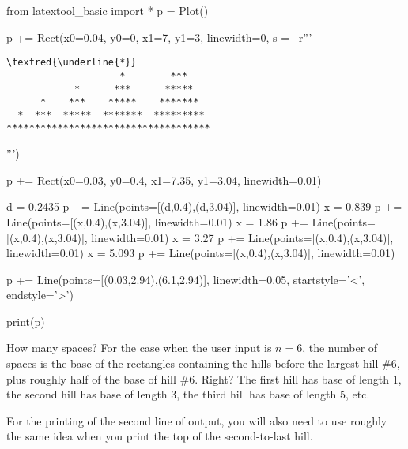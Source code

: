 \begin{python}
from latextool_basic import *
p = Plot()

p += Rect(x0=0.04, y0=0, x1=7, y1=3, linewidth=0, s = \
r'''\begin{Verbatim}[commandchars=\\\{\}]
                              \textred{\underline{*}}     
                    *        ***    
            *      ***      *****   
      *    ***    *****    *******  
  *  ***  *****  *******  ********* 
************************************
\end{Verbatim}''')

p += Rect(x0=0.03, y0=0.4, x1=7.35, y1=3.04, linewidth=0.01)

d = 0.2435
p += Line(points=[(d,0.4),(d,3.04)], linewidth=0.01)
x = 0.839
p += Line(points=[(x,0.4),(x,3.04)], linewidth=0.01)
x = 1.86
p += Line(points=[(x,0.4),(x,3.04)], linewidth=0.01)
x = 3.27
p += Line(points=[(x,0.4),(x,3.04)], linewidth=0.01)
x = 5.093
p += Line(points=[(x,0.4),(x,3.04)], linewidth=0.01)

p += Line(points=[(0.03,2.94),(6.1,2.94)], linewidth=0.05, startstyle='<', endstyle='>')


print(p)
\end{python}

How many spaces?
For the case when the user input is $n = 6$, the number of spaces
is the base of the rectangles containing the hills
before the largest hill \#6, plus roughly half of the base of hill \#6.
Right?
The first hill has base of length 1, the second hill has base of length 3,
the third hill has base of length 5, etc.

For the printing of the second line of output, you will also need to
use roughly the same idea when you print the top of the second-to-last
hill.
